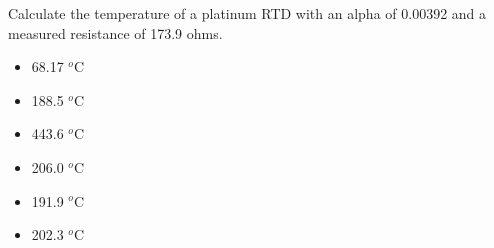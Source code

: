 Calculate the temperature of a platinum RTD with an alpha of 0.00392 and a measured resistance of 173.9 ohms.

\begin{itemize}
\item{} 68.17 $^{o}$C 
\vskip 5pt 
\item{} 188.5 $^{o}$C
\vskip 5pt 
\item{} 443.6 $^{o}$C
\vskip 5pt 
\item{} 206.0 $^{o}$C 
\vskip 5pt 
\item{} 191.9 $^{o}$C 
\vskip 5pt 
\item{} 202.3 $^{o}$C 
\end{itemize}




